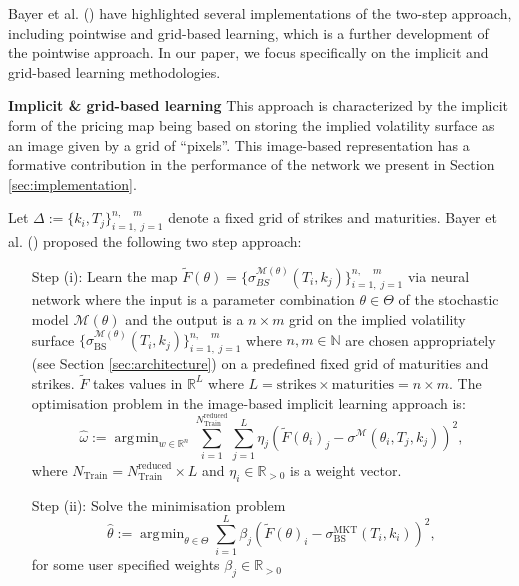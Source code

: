 \documentclass{article}
\theoremstyle{remark}
\DeclareMathOperator*{\argmin}{\arg\!\min}
\begin{document}
Bayer et al. (\cite{BHMST19}) have highlighted several implementations of the two-step approach,
including pointwise and grid-based learning, which is a further development of the pointwise approach.
In our paper, we focus specifically on the implicit and grid-based learning methodologies.

\vspace*{0.5cm}
\textbf{Implicit \& grid-based learning}
This approach is characterized by the implicit form of the pricing map being based
on storing the implied volatility surface as an image given by a grid of ``pixels''.
This image-based representation has a formative contribution in
the performance of the network we present in Section \ref{sec:implementation}. 

Let 
$\Delta:=\{k_i,T_j\}_{i=1,\;j=1}^{n,\;\;\;\;m}$
denote a fixed grid of strikes and
maturities.
Bayer et al. (\cite{BHMST19}) proposed the following two step approach:
\begin{enumerate}
\item[Step (i):] Learn the map
  $\widetilde{F}(\theta)=\{\sigma^{\mathcal{M}(\theta)}_{BS}(T_i,k_j)\}_{i=1,\;j=1}^{n,\;\;\;\;m}$
  via neural network where the input is a parameter combination
  $\theta\in\Theta$ of the stochastic model $\mathcal{M}(\theta)$ and the
  output is a $n\times m$ grid on the implied volatility surface
  $\{\sigma^{\mathcal{M}(\theta)}_{\mathrm{BS}}(T_i,k_j)\}_{i=1,\;j=1}^{n,\;\;\;\;m}$
  where $n,m\in\mathbb{N}$ are chosen appropriately (see Section
  \ref{sec:architecture}) on a predefined fixed grid of maturities and
  strikes. $\widetilde{F}$ takes values in $\mathbb{R}^L$  where
  $L=\textrm{strikes}\times \textrm{maturities} = n \times m$.
  The optimisation problem in the image-based implicit learning
  approach is:
  \begin{equation}\label{eq:gridbased_loss}
    \widehat{\omega}:=
    \argmin_{w\in\mathbb{R}^n}\sum_{i=1}^{N_{\mathrm{Train}}^{\mathrm{reduced}}}
    \sum_{j=1}^{L} \eta_j(\widetilde{F}(\theta_{i})_j-\sigma^{\mathcal{M}}(\theta_{i},T_j,k_j))^2, 
  \end{equation}
where 
$N_{\mathrm{Train}}=N_{\mathrm{Train}}^{\mathrm{reduced}} \times L$ and $\eta_i\in\mathbb{R}_{>0}$ is a weight vector.  
\item[Step (ii):] Solve the minimisation problem $$\widehat{\theta}:=\argmin_{\theta\in\Theta}\sum_{i=1}^L \beta_j(\widetilde{F}(\theta)_{i}-\sigma^{\mathrm{MKT}}_{\mathrm{BS}}(T_i,k_i))^2,$$ 
for some user specified weights $\beta_j\in\mathbb{R}_{>0}$
\end{enumerate}
\end{document}
